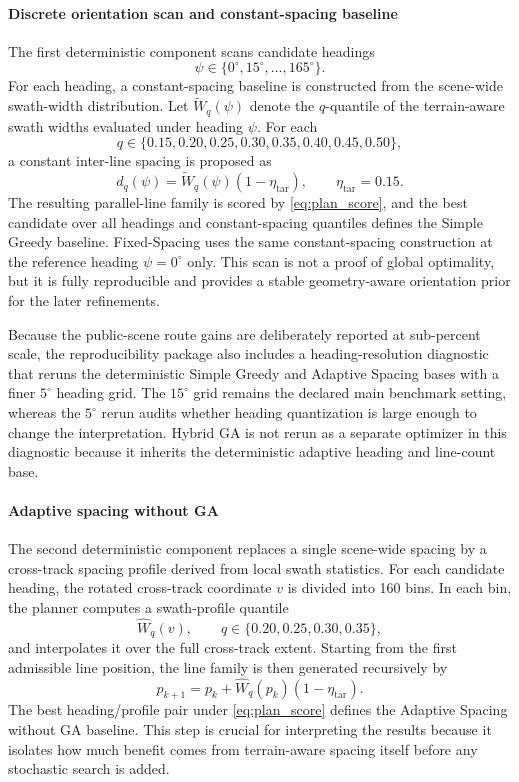 \documentclass[jmse,article,submit,moreauthors]{Definitions/mdpi}
\begin{document}
\paragraph{Discrete orientation scan and constant-spacing baseline}
The first deterministic component scans candidate headings
\[
\psi \in \{0^{\circ},15^{\circ},\ldots,165^{\circ}\}.
\]
For each heading, a constant-spacing baseline is constructed from the scene-wide swath-width distribution. Let $\widetilde{W}_{q}(\psi)$ denote the $q$-quantile of the terrain-aware swath widths evaluated under heading $\psi$. For each
\[
q \in \{0.15,0.20,0.25,0.30,0.35,0.40,0.45,0.50\},
\]
a constant inter-line spacing is proposed as
\begin{equation}
d_q(\psi)=\widetilde{W}_{q}(\psi)\left(1-\eta_{\mathrm{tar}}\right),
\qquad \eta_{\mathrm{tar}}=0.15.
\end{equation}
The resulting parallel-line family is scored by \eqref{eq:plan_score}, and the best candidate over all headings and constant-spacing quantiles defines the Simple Greedy baseline. Fixed-Spacing uses the same constant-spacing construction at the reference heading $\psi=0^{\circ}$ only. This scan is not a proof of global optimality, but it is fully reproducible and provides a stable geometry-aware orientation prior for the later refinements.

Because the public-scene route gains are deliberately reported at sub-percent scale, the reproducibility package also includes a heading-resolution diagnostic that reruns the deterministic Simple Greedy and Adaptive Spacing bases with a finer \(5^{\circ}\) heading grid. The \(15^{\circ}\) grid remains the declared main benchmark setting, whereas the \(5^{\circ}\) rerun audits whether heading quantization is large enough to change the interpretation. Hybrid GA is not rerun as a separate optimizer in this diagnostic because it inherits the deterministic adaptive heading and line-count base.

\paragraph{Adaptive spacing without GA}
The second deterministic component replaces a single scene-wide spacing by a cross-track spacing profile derived from local swath statistics. For each candidate heading, the rotated cross-track coordinate $v$ is divided into 160 bins. In each bin, the planner computes a swath-profile quantile
\[
\widehat{W}_{q}(v), \qquad q \in \{0.20,0.25,0.30,0.35\},
\]
and interpolates it over the full cross-track extent. Starting from the first admissible line position, the line family is then generated recursively by
\begin{equation}
p_{k+1}=p_k+\widehat{W}_{q}(p_k)\left(1-\eta_{\mathrm{tar}}\right).
\label{eq:adaptive_spacing}
\end{equation}
The best heading/profile pair under \eqref{eq:plan_score} defines the Adaptive Spacing without GA baseline. This step is crucial for interpreting the results because it isolates how much benefit comes from terrain-aware spacing itself before any stochastic search is added.
\end{document}
